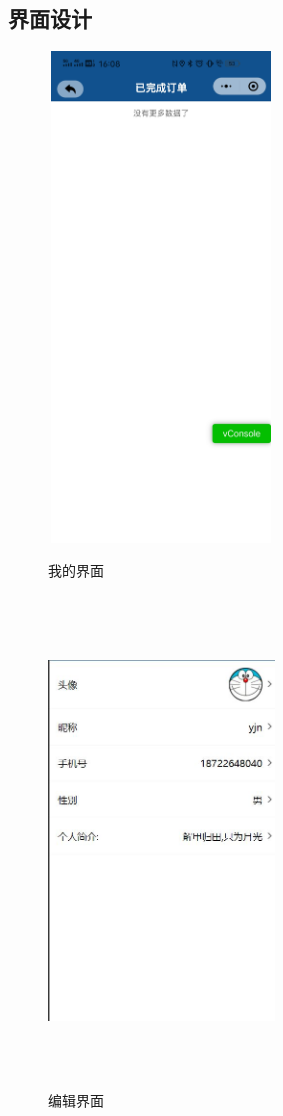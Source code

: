 \subsection{界面设计}
\begin{figure}[htbp]
    \centering
    \begin{minipage}[t]{0.48\textwidth}
    \centering
    \includegraphics[width=6cm,height=13cm]{design/image/ui8.png} 
    \caption{我的界面}
    \end{minipage}
    \begin{minipage}[t]{0.48\textwidth}
    \centering
    \includegraphics[width=6cm,height=13cm]{design/image/bianji.png}
    \caption{编辑界面}
    \end{minipage}
    \end{figure}

